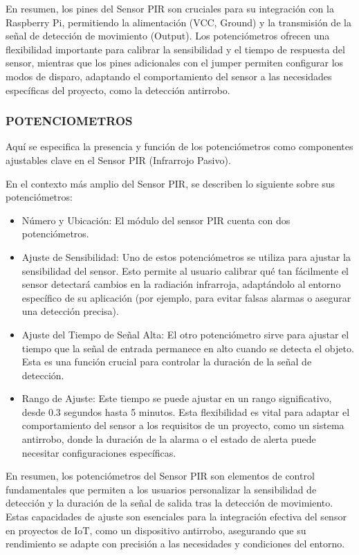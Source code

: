 \documentclass{report}
\begin{document}
En resumen, los pines del Sensor PIR son cruciales para su integración con la Raspberry Pi, permitiendo la alimentación (VCC, Ground) y la transmisión 
de la señal de detección de movimiento (Output). Los potenciómetros ofrecen una flexibilidad importante para calibrar la sensibilidad y el tiempo de 
respuesta del sensor, mientras que los pines adicionales con el jumper permiten configurar los modos de disparo, adaptando el comportamiento del sensor 
a las necesidades específicas del proyecto, como la detección antirrobo.

\subsubsection{POTENCIOMETROS}
Aquí se especifica la presencia y función de los potenciómetros como componentes ajustables clave en 
el Sensor PIR (Infrarrojo Pasivo).

En el contexto más amplio del Sensor PIR, se  describen lo siguiente sobre sus potenciómetros:
\begin{itemize}
    \item Número y Ubicación: El módulo del sensor PIR cuenta con dos potenciómetros.
    \item Ajuste de Sensibilidad: Uno de estos potenciómetros se utiliza para ajustar la sensibilidad del sensor. Esto permite al usuario calibrar 
    qué tan fácilmente el sensor detectará cambios en la radiación infrarroja, adaptándolo al entorno específico de su aplicación (por ejemplo, 
    para evitar falsas alarmas o asegurar una detección precisa).
    \item Ajuste del Tiempo de Señal Alta: El otro potenciómetro sirve para ajustar el tiempo que la señal de entrada permanece en alto cuando se detecta 
    el objeto. Esta es una función crucial para controlar la duración de la señal de detección.
    \item Rango de Ajuste: Este tiempo se puede ajustar en un rango significativo, desde 0.3 segundos hasta 5 minutos. Esta flexibilidad es vital para 
    adaptar el comportamiento del sensor a los requisitos de un proyecto, como un sistema antirrobo, donde la duración de la alarma o el estado de alerta 
    puede necesitar configuraciones específicas.
\end{itemize}

En resumen, los potenciómetros del Sensor PIR son elementos de control fundamentales que permiten a los usuarios personalizar la sensibilidad de detección 
y la duración de la señal de salida tras la detección de movimiento. Estas capacidades de ajuste son esenciales para la integración efectiva del sensor 
en proyectos de IoT, como un dispositivo antirrobo, asegurando que su rendimiento se adapte con precisión a las necesidades y condiciones del entorno.
\end{document}
